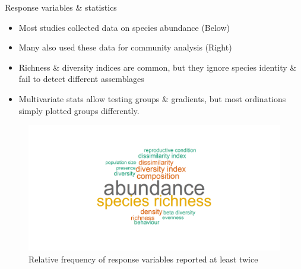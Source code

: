 \documentclass[final]{beamer}\usepackage[]{graphicx}\usepackage[]{color}
\newlength{\twocolwid}
\begin{document}
\begin{frame}[t]
\begin{columns}[t]
\begin{column}{\twocolwid}
\begin{columns}[t,totalwidth=\twocolwid]
\begin{column}{0.6\textwidth} %
\begin{alertblock}{Response variables \& statistics}
 \normalsize
 \raggedright
\begin{itemize}
\item Most studies collected data on species abundance (Below)
\item Many also used these data for community analysis (Right)
\item Richness \& diversity indices are common, but they ignore species identity \& fail to detect different assemblages
\item Multivariate stats allow testing groups \& gradients, but most ordinations simply plotted groups differently.
\end{itemize}
 \end{alertblock} 
 \begin{figure}\caption{Relative frequency of response variables reported at least twice}
\includegraphics[trim=6.5cm 2cm 6.5cm 2cm, clip, width=0.98\linewidth]{figure/responses_wc}
\end{figure}

\end{column} %


\end{columns}
\end{column}
\end{columns}
\end{frame}
\end{document}
